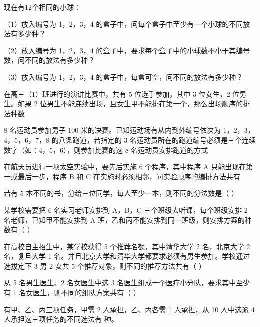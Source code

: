 \begin{homework}
现在有\(12\)个相同的小球：

（1）放入编号为 1，2，3，4 的盒子中，问每个盒子中至少有一个小球的不同放法有多少种？

（2）放入编号为 1，2，3，4 的盒子中，要求每个盒子中的小球数不小于其编号数，问不同的放法有多少种？

（3）放入编号为 1，2，3，4 的盒子中，每盒可空，问不同的放法有多少种？
\end{homework}
\begin{homework}
    在高三（1）班进行的演讲比赛中，共有 5 位选手参加，其中 3 位女生，2 位男生。如果 2 位男生不能连续出场，且女生甲不能排在第一个，那么出场顺序的排法种数
\end{homework}
\begin{homework}
    8 名运动员参加男子 100 米的决赛。已知运动场有从内到外编号依次为 1，2，3，4，5，6，7，8 的八条跑道，若指定的 3 名运动员所在的跑道编号必须是三个连续数字（如：4，5，6），则参加比赛的这 8 名运动员安排跑道的方式
\end{homework}
\begin{homework}
    在航天员进行一项太空实验中，要先后实施 6 个程序，其中程序 A 只能出现在第一或最后一步，程序 B 和 C 在实施时必须相邻，问实验顺序的编排方法共有
\end{homework}
\begin{homework}
    若有 5 本不同的书，分给三位同学，每人至少一本，则不同的分法数是（ ）
\end{homework}
\begin{homework}
    某学校需要把 6 名实习老师安排到 A，B，C 三个班级去听课，每个班级安排 2 名老师，已知甲不能安排到 A 班，乙和丙不能安排到同一班级，则安排方案的种数有（ ）

\end{homework}
\begin{homework}
    在高校自主招生中，某学校获得 5 个推荐名额，其中清华大学 2 名，北京大学 2 名，复旦大学 1 名。并且北京大学和清华大学都要求必须有男生参加。学校通过选拔定下 3 男 2 女共 5 个推荐对象，则不同的推荐方法共有（ ）
\end{homework}
\begin{homework}
    从 5 名男生医生、2 名女医生中选 3 名医生组成一个医疗小分队，要求其中至少有 1 名女医生，则不同的组队方案共有（ ）
\end{homework}
\begin{homework}
    有甲、乙、丙三项任务，甲需 2 人承担，乙、丙各需 1 人承担，从 10 人中选派 4 人承担这三项任务的不同选法有 种。
\end{homework}
